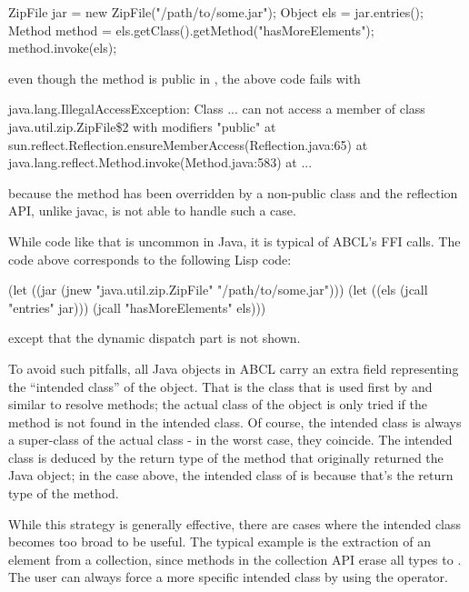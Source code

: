 \documentclass[10pt]{book}
\begin{document}
\begin{listing-java}
ZipFile jar = new ZipFile("/path/to/some.jar");
Object els = jar.entries();
Method method = els.getClass().getMethod("hasMoreElements");
method.invoke(els);
\end{listing-java}

even though the method  is public in ,
the above code fails with

\begin{listing-java}
java.lang.IllegalAccessException: Class ... can
not access a member of class java.util.zip.ZipFile\$2 with modifiers
"public"
       at sun.reflect.Reflection.ensureMemberAccess(Reflection.java:65)
       at java.lang.reflect.Method.invoke(Method.java:583)
       at ...
\end{listing-java}

because the method has been overridden by a non-public class and the
reflection API, unlike javac, is not able to handle such a case.

While code like that is uncommon in Java, it is typical of ABCL's FFI
calls. The code above corresponds to the following Lisp code:

\begin{listing-lisp}
(let ((jar (jnew "java.util.zip.ZipFile" "/path/to/some.jar")))
  (let ((els (jcall "entries" jar)))
    (jcall "hasMoreElements" els)))
\end{listing-lisp}

except that the dynamic dispatch part is not shown.

To avoid such pitfalls, all Java objects in \textsc{ABCL} carry an extra
field representing the ``intended class'' of the object. That is the class
that is used first by  and similar to resolve methods;
the actual class of the object is only tried if the method is not found
in the intended class. Of course, the intended class is always a super-class
of the actual class - in the worst case, they coincide. The intended class
is deduced by the return type of the method that originally returned
the Java object; in the case above, the intended class of 
is  because that's the return type of
the  method.

While this strategy is generally effective, there are cases where the
intended class becomes too broad to be useful. The typical example
is the extraction of an element from a collection, since methods in
the collection API erase all types to . The user can
always force a more specific intended class by using the 
operator.
\end{document}
